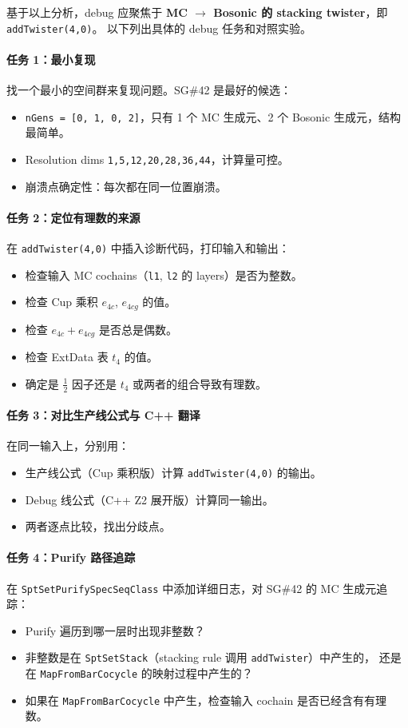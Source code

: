 \documentclass[a4paper,fontset=ubuntu,12pt]{ctexart}
\begin{document}
基于以上分析，debug 应聚焦于 \textbf{MC $\to$ Bosonic 的 stacking twister}，即 \texttt{addTwister(4,0)}。
以下列出具体的 debug 任务和对照实验。

\paragraph{任务 1：最小复现}
找一个最小的空间群来复现问题。SG\#42 是最好的候选：
\begin{itemize}
\item \texttt{nGens = [0, 1, 0, 2]}，只有 1 个 MC 生成元、2 个 Bosonic 生成元，结构最简单。
\item Resolution dims \texttt{1,5,12,20,28,36,44}，计算量可控。
\item 崩溃点确定性：每次都在同一位置崩溃。
\end{itemize}

\paragraph{任务 2：定位有理数的来源}
在 \texttt{addTwister(4,0)} 中插入诊断代码，打印输入和输出：
\begin{itemize}
\item 检查输入 MC cochains（\texttt{l1}, \texttt{l2} 的 layers）是否为整数。
\item 检查 Cup 乘积 $e_{4c}$, $e_{4cg}$ 的值。
\item 检查 $e_{4c} + e_{4cg}$ 是否总是偶数。
\item 检查 ExtData 表 $t_4$ 的值。
\item 确定是 $\frac{1}{2}$ 因子还是 $t_4$ 或两者的组合导致有理数。
\end{itemize}

\paragraph{任务 3：对比生产线公式与 C++ 翻译}
在同一输入上，分别用：
\begin{itemize}
\item 生产线公式（Cup 乘积版）计算 \texttt{addTwister(4,0)} 的输出。
\item Debug 线公式（C++ Z2 展开版）计算同一输出。
\item 两者逐点比较，找出分歧点。
\end{itemize}

\paragraph{任务 4：Purify 路径追踪}
在 \texttt{SptSetPurifySpecSeqClass} 中添加详细日志，对 SG\#42 的 MC 生成元追踪：
\begin{itemize}
\item Purify 遍历到哪一层时出现非整数？
\item 非整数是在 \texttt{SptSetStack}（stacking rule 调用 \texttt{addTwister}）中产生的，
  还是在 \texttt{MapFromBarCocycle} 的映射过程中产生的？
\item 如果在 \texttt{MapFromBarCocycle} 中产生，检查输入 cochain 是否已经含有有理数。
\end{itemize}
\end{document}
